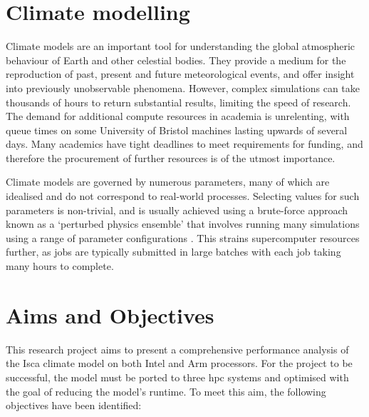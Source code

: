 \documentclass[a4paper,11pt]{report}
\begin{document}
\section{Climate modelling}
Climate models are an important tool for understanding the global atmospheric behaviour of Earth and other celestial bodies. They provide a medium for the reproduction of past, present and future meteorological events, and offer insight into previously unobservable phenomena. However, complex simulations can take thousands of hours to return substantial results, limiting the speed of research. The demand for additional compute resources in academia is unrelenting, with queue times on some University of Bristol machines lasting upwards of several days. Many academics have tight deadlines to meet requirements for funding, and therefore the procurement of further resources is of the utmost importance.%
\par
Climate models are governed by numerous parameters, many of which are idealised and do not correspond to real-world processes. Selecting values for such parameters is non-trivial, and is usually achieved using a brute-force approach known as a ‘perturbed physics ensemble’ that involves running many simulations using a range of parameter configurations \cite{evans2012evaluating}. This strains supercomputer resources further, as jobs are typically submitted in large batches with each job taking many hours to complete.


\section{Aims and Objectives}
This research project aims to present a comprehensive performance analysis of the Isca climate model on both Intel and Arm processors. For the project to be successful, the model must be ported to three \gls{hpc} systems and optimised with the goal of reducing the model's runtime. To meet this aim, the following objectives have been identified:
\end{document}
